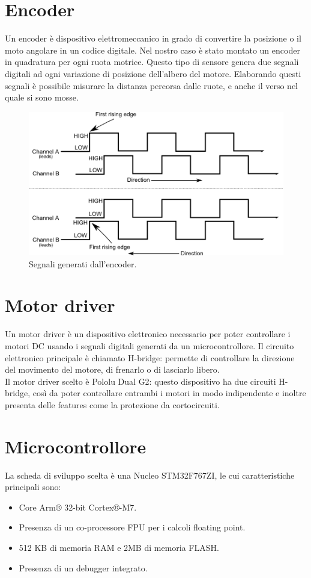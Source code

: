 \section{Encoder}
Un encoder è dispositivo elettromeccanico in grado di convertire la posizione o il moto angolare in un codice digitale.
Nel nostro caso è stato montato un encoder in quadratura per ogni ruota motrice.
Questo tipo di sensore genera due segnali digitali ad ogni variazione di posizione dell'albero del motore.
Elaborando questi segnali è possibile misurare la distanza percorsa dalle ruote, e anche il verso nel quale si sono mosse.
\begin{figure}[H]
\centering
\includegraphics[scale=0.5]{images/quad-encoding-waveform.png}
\caption{Segnali generati dall'encoder.}
\end{figure}

\section{Motor driver}
Un motor driver è un dispositivo elettronico necessario per poter controllare i motori DC usando i segnali digitali generati da un microcontrollore.
Il circuito elettronico principale è chiamato H-bridge: permette di controllare la direzione del movimento del motore, di frenarlo o di lasciarlo libero. \\
Il motor driver scelto è Pololu Dual G2: questo dispositivo ha due circuiti H-bridge, così da poter controllare entrambi i motori in modo indipendente e inoltre presenta delle features come la protezione da cortocircuiti.

\section{Microcontrollore}
La scheda di sviluppo scelta è una Nucleo STM32F767ZI, le cui caratteristiche principali sono:
\begin{itemize}
    \item Core Arm® 32-bit Cortex®-M7.
    \item Presenza di un co-processore FPU per i calcoli floating point.
    \item 512 KB di memoria RAM e 2MB di memoria FLASH.
    \item Presenza di un debugger integrato.
\end{itemize}

